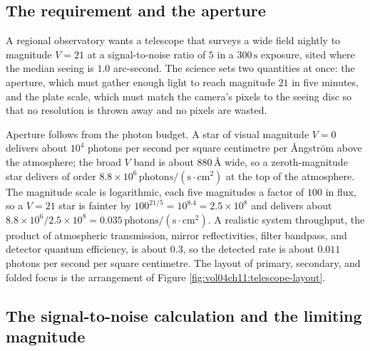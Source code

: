 \subsection{The requirement and the aperture}

A regional observatory wants a telescope that surveys a wide field nightly to
magnitude $V = 21$ at a signal-to-noise ratio of $5$ in a
$300\,\si{\second}$ exposure, sited where the median seeing is
$1.0$ arc-second. The science sets two quantities at once: the aperture, which
must gather enough light to reach magnitude $21$ in five minutes, and the
plate scale, which must match the camera's pixels to the seeing disc so that no
resolution is thrown away and no pixels are wasted.

Aperture follows from the photon budget. A star of visual magnitude $V = 0$
delivers about $10^{4}$ photons per second per square centimetre per
\AA ngstr\"om above the atmosphere; the broad $V$ band is about
$880\,\text{\AA}$ wide, so a zeroth-magnitude star delivers of order
$8.8\times 10^{6}\,\text{photons}/(\text{s}\cdot\text{cm}^{2})$ at the top of
the atmosphere.
The magnitude scale is logarithmic, each five magnitudes a factor of $100$ in
flux, so a $V = 21$ star is fainter by $100^{21/5} = 10^{8.4} = 2.5\times
10^{8}$ and delivers about
$8.8\times 10^{6}/2.5\times 10^{8} = 0.035\,\text{photons}/(\text{s}\cdot
\text{cm}^{2})$. A
realistic system throughput, the product of atmospheric transmission, mirror
reflectivities, filter bandpass, and detector quantum efficiency, is about
$0.3$, so the detected rate is about $0.011$ photons per second per square
centimetre. The layout of primary, secondary, and folded focus is the
arrangement of Figure \ref{fig:vol04ch11:telescope-layout}.



\subsection{The signal-to-noise calculation and the limiting magnitude}

